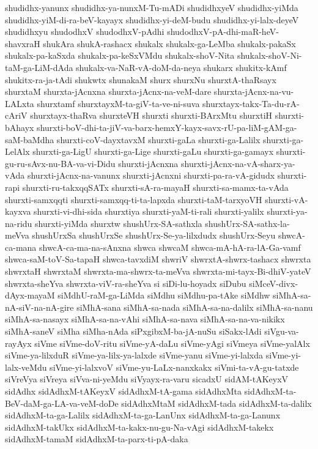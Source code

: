 {shudidhx-yanunx
shudidhx-ya-nunxM-Tu-mADi
shudidhxyeV
shudidhx-yiMda
shudidhx-yiM-di-ra-beV-kayayx
shudidhx-yi-deM-budu
shudidhx-yi-lalx-deyeV
shudidhxyu
shudodhxV
shudodhxV-pAdhi
shudodhxV-pA-dhi-maR-heV-shavxraH
shukAra
shukA-rashacx
shukalx
shukalx-ga-LeMba
shukalx-pakaSx
shukalx-pa-kaSxda
shukalx-pa-keSxVMdu
shukalx-shoV-Nita
shukalx-shoV-Ni-taM-ga-LiM-dAda
shukalx-va-NaR-vA-doM-da-neya
shukarx
shukitx-kAmf
shukitx-ra-ja-tAdi
shukwtx
shunakaM
shurx
shurxNu
shurxtA-thaRsayx
shurxtaM
shurxta-jAcnxna
shurxta-jAcnx-na-veM-dare
shurxta-jAcnx-na-vu-LALxta
shurxtamf
shurxtayxM-ta-giV-ta-ve-ni-suva
shurxtayx-takx-Ta-du-rA-cAriV
shurxtayx-thaRva
shurxteVH
shurxti
shurxti-BArxMtu
shurxtiH
shurxti-bAhayx
shurxti-boV-dhi-ta-jiV-va-barx-hemxY-kayx-savx-rU-pa-liM-gAM-ga-saM-baMdha
shurxti-coV-dayxtavxM
shurxti-gaLa
shurxti-ga-Lalilx
shurxti-ga-LelAlx
shurxti-ga-LigU
shurxti-ga-Lige
shurxti-gaLu
shurxti-ga-gamayx
shurxti-gu-ru-sAvx-nu-BA-va-vi-Didu
shurxti-jAcnxna
shurxti-jAcnx-na-vA-sharx-ya-vAda
shurxti-jAcnx-na-vanunx
shurxti-jAcnxni
shurxti-pa-ra-vA-gidudx
shurxti-rapi
shurxti-ru-takxqqSATx
shurxti-sA-ra-mayaH
shurxti-sa-mamx-ta-vAda
shurxti-samxqqti
shurxti-samxqq-ti-ta-lapxda
shurxti-taM-tarxyoVH
shurxti-vA-kayxva
shurxti-vi-dhi-sida
shurxtiya
shurxti-yaM-ti-rali
shurxti-yalilx
shurxti-ya-na-ridu
shurxti-yiMda
shurxtw
shushUrx-SA-sathxla
shushUrx-SA-sathx-la-meVva
shushUrxSa
shushUrxSe
shushUrx-Se-ya-lilxdudx
shushUrx-Seyu
shwcA-ca-mana
shwcA-ca-ma-na-sAnxna
shwca
shwcaM
shwca-mA-hA-ra-lA-Ga-vamf
shwca-saM-toV-Sa-tapaH
shwca-tavxdiM
shwriV
shwrxtA-shwrx-tashacx
shwrxta
shwrxtaH
shwrxtaM
shwrxta-ma-shwrx-ta-meVva
shwrxta-mi-tayx-Bi-dhiV-yateV
shwrxta-sheYva
shwrxta-viV-ra-sheYva
si
siDi-lu-hoyadx
siDubu
siMceV-divx-dAyx-mayaM
siMdhU-raM-ga-LiMda
siMdhu
siMdhu-pa-tAke
siMdhw
siMhA-sa-nA-siV-na-nA-gire
siMhA-sana
siMhA-sa-nada
siMhA-sa-na-dalilx
siMhA-sa-nanu
siMhA-sa-nasayx
siMhA-sa-na-vAhi
siMhA-sa-nava
siMhA-sa-na-va-nikikx
siMhA-saneV
siMha
siMha-nAda
siPxgibxM-ba-jA-nuSu
siSakx-lAdi
siVgu-va-rayAyx
siVme
siVme-doV-ritu
siVme-yA-daLu
siVme-yAgi
siVmeya
siVme-yalAlx
siVme-ya-lilxduR
siVme-ya-lilx-ya-lalxde
siVme-yanu
siVme-yi-lalxda
siVme-yi-lalx-veMdu
siVme-yi-lalxvoV
siVme-yu-LaLx-nanxkakx
siVmi-ta-vA-gu-tatxde
siVreVya
siVreya
siVva-ni-yeMdu
siVyayx-ra-varu
sicadxU
sidAM-tAKeyxV
sidAdhx
sidAdhxM-tAKeyxV
sidAdhxM-tA-gama
sidAdhxMta
sidAdhxM-ta-BeV-daM-ga-LA-va-veM-doDe
sidAdhxMtaM
sidAdhxM-tada
sidAdhxM-ta-dalilx
sidAdhxM-ta-ga-Lalilx
sidAdhxM-ta-ga-LanUnx
sidAdhxM-ta-ga-Lanunx
sidAdhxM-takUkx
sidAdhxM-ta-kakx-nu-gu-Na-vAgi
sidAdhxM-takekx
sidAdhxM-tamaM
sidAdhxM-ta-parx-ti-pA-daka
}

